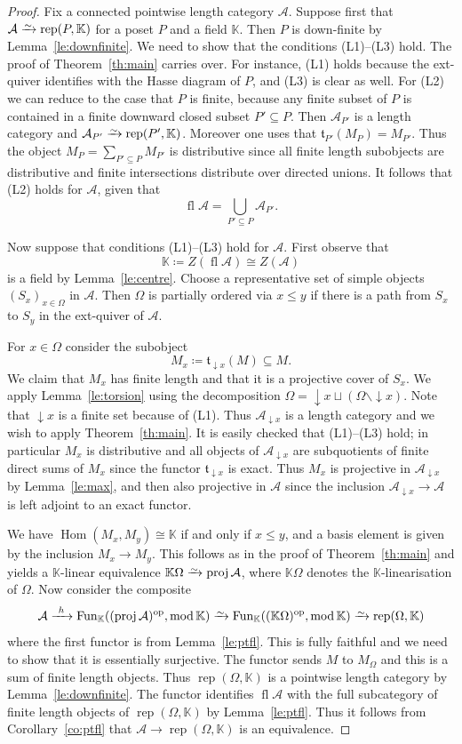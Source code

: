 \documentclass[10pt,a4paper]{amsart}
\def\A{\mathcal A}
\newcommand{\Fun}{\operatorname{Fun}}
\newcommand{\Hom}{\operatorname{Hom}}
\def\Om{\Omega}
\def\bbK{\mathbb K}
\newcommand{\fl}{\operatorname{fl}}
\newcommand{\frt}{\mathfrak{t}}
\newcommand{\iso}{\xrightarrow{\raisebox{-.4ex}[0ex][0ex]{$\scriptstyle{\sim}$}}}
\renewcommand{\mod}{\operatorname{mod}}
\newcommand{\op}{\mathrm{op}}
\newcommand{\proj}{\operatorname{proj}}
\newcommand{\rep}{\operatorname{rep}}
\newcommand{\xto}{\xrightarrow}
\begin{document}
\begin{proof}
  Fix a connected pointwise length category $\A$.  Suppose first that
  $\A\iso\rep(P,\bbK)$ for a poset $P$ and a field $\bbK$. Then $P$ is
  down-finite by Lemma~\ref{le:downfinite}. We need to show that the
  conditions (L1)--(L3) hold. The proof of Theorem~\ref{th:main}
  carries over. For instance, (L1) holds because the ext-quiver
  identifies with the Hasse diagram of $P$, and (L3) is clear as well.
  For (L2) we can reduce to the case that $P$ is finite, because any
  finite subset of $P$ is contained in a finite downward closed subset
  $P'\subseteq P$. Then $\A_{P'}$ is a length category and
  $\A_{P'}\iso\rep(P',\bbK)$. Moreover one uses that
  $\frt_{P'}(M_P)=M_{P'}$. Thus the object
  $M_P=\sum_{P'\subseteq P} M_{P'}$ is distributive since all
  finite length subobjects are distributive and finite intersections
  distribute over directed unions. It follows that (L2) holds for $\A$,
  given that
  \[\fl\A=\bigcup_{P'\subseteq P}\A_{P'}.\]

  Now suppose that conditions (L1)--(L3) hold for $\A$. First observe
  that \[\bbK\coloneqq Z(\fl\A)\cong Z(\A)\] is a field by
  Lemma~\ref{le:centre}. Choose a representative set of simple
  objects $(S_x)_{x\in \Om}$ in $\A$. Then $\Om$ is partially ordered  via $x\le y$ if
  there is a path from $S_x$ to $S_y$ in the ext-quiver of $\A$. 

  For $x\in \Om$ consider the subobject
  \[M_x\coloneqq \frt_{\downarrow x}(M)\subseteq M.\] We claim that $M_x$
  has finite length and that it is a projective cover of $S_x$. We
  apply Lemma~\ref{le:torsion} using the decomposition
  $\Om=\downarrow\!  x\sqcup(\Om\smallsetminus\downarrow\! x)$. Note that
  $\downarrow\!  x$ is a finite set because of (L1).
Thus $\A_{\downarrow x}$ is a length category and we wish to apply
  Theorem~\ref{th:main}.  It is easily checked that (L1)--(L3) hold; in
  particular $M_x$ is distributive and all objects of
  $\A_{\downarrow x}$ are subquotients of finite direct sums of $M_x$
  since the functor $\frt_{\downarrow x}$ is exact. Thus $M_x$ is
  projective in $\A_{\downarrow x}$ by Lemma~\ref{le:max},
  and then also projective in $\A$ since the inclusion
  $\A_{\downarrow x}\to\A$ is left adjoint to an exact functor.

  We have $\Hom(M_x,M_y)\cong\bbK$ if and only if $x\le y$, and a
  basis element is given by the inclusion $M_x\to M_y$. This follows
  as in the proof of Theorem~\ref{th:main} and yields a $\bbK$-linear
  equivalence $\bbK \Om\iso\proj\A$, where $\bbK \Om$ denotes the
  $\bbK$-linearisation of $\Om$.  Now consider the composite
\[\A\xto{\ h\ }\Fun_\bbK((\proj\A)^\op,\mod\bbK)\iso\Fun_\bbK((\bbK
  \Om)^\op,\mod\bbK) \iso\rep(\Om,\bbK)\]
where the first  functor is
from Lemma~\ref{le:ptfl}. This is fully faithful and we need to
show that it is essentially surjective. The functor sends $M$ to $M_\Om$
and this is a sum of finite length objects. Thus $\rep(\Om,\bbK)$ is a
pointwise length category by Lemma~\ref{le:downfinite}. The functor
identifies $\fl\A$ with the full subcategory of finite length objects
of $\rep(\Om,\bbK)$ by Lemma~\ref{le:ptfl}. Thus it follows from
Corollary~\ref{co:ptfl} that $\A\to \rep(\Om,\bbK)$ is an equivalence.
\end{proof}
\end{document}
